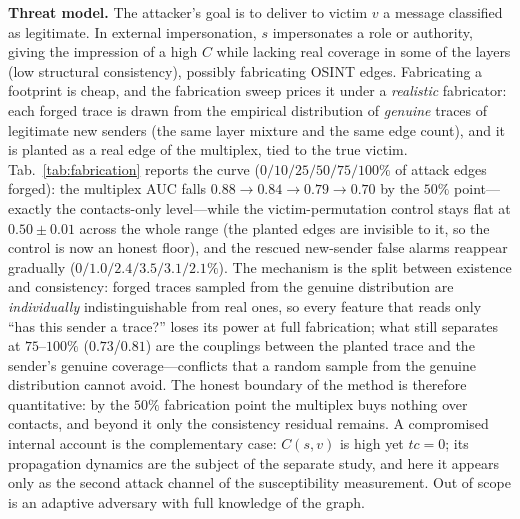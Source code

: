 \documentclass[conference]{IEEEtran}
\begin{document}
\textbf{Threat model.} The attacker's goal is to deliver to victim $v$ a message classified as legitimate. In
external impersonation, $s$ impersonates a role or authority, giving the impression of a high $C$ while
lacking real coverage in some of the layers (low structural consistency), possibly fabricating OSINT edges.
Fabricating a footprint is cheap, and the fabrication sweep prices it under a \emph{realistic} fabricator:
each forged trace is drawn from the empirical distribution of \emph{genuine} traces of legitimate new
senders (the same layer mixture and the same edge count), and it is planted as a real edge of the
multiplex, tied to the true victim. Tab.~\ref{tab:fabrication} reports the curve
($0/10/25/50/75/100\%$ of attack edges forged): the multiplex AUC falls
$0.88\!\to\!0.84\!\to\!0.79\!\to\!0.70$ by the $50\%$ point---exactly the contacts-only level---while
the victim-permutation control stays flat at $0.50{\pm}0.01$ across the whole range (the planted edges
are invisible to it, so the control is now an honest floor), and the rescued new-sender false alarms
reappear gradually ($0/1.0/2.4/3.5/3.1/2.1\%$). The mechanism is the split between existence and
consistency: forged traces sampled from the genuine distribution are \emph{individually} indistinguishable
from real ones, so every feature that reads only ``has this sender a trace?'' loses its power at full
fabrication; what still separates at $75$--$100\%$ ($0.73$/$0.81$) are the couplings between the
planted trace and the sender's genuine coverage---conflicts that a random sample from the genuine
distribution cannot avoid. The honest boundary of the method is therefore quantitative: by the
$50\%$ fabrication point the multiplex buys nothing over contacts, and beyond it only the
consistency residual remains. A compromised
internal account is the complementary case: $C(s,v)$ is high yet $tc=0$; its propagation dynamics are the
subject of the separate study, and here it appears only as the second attack channel of the susceptibility
measurement. Out of scope is an adaptive adversary with full knowledge of the graph.
\end{document}
